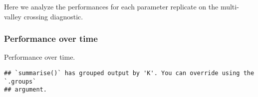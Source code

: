 \documentclass[]{book}
\newenvironment{Shaded}{\begin{snugshade}}{\end{snugshade}}
\newcommand{\DataTypeTok}[1]{\textcolor[rgb]{0.13,0.29,0.53}{#1}}
\newcommand{\KeywordTok}[1]{\textcolor[rgb]{0.13,0.29,0.53}{\textbf{#1}}}
\newcommand{\NormalTok}[1]{#1}
\newcommand{\OperatorTok}[1]{\textcolor[rgb]{0.81,0.36,0.00}{\textbf{#1}}}
\newcommand{\StringTok}[1]{\textcolor[rgb]{0.31,0.60,0.02}{#1}}
\begin{document}
Here we analyze the performances for each parameter replicate on the multi-valley crossing diagnostic.

\hypertarget{performance-over-time-25}{%
\subsubsection{Performance over time}\label{performance-over-time-25}}

Performance over time.

\begin{Shaded}
\end{Shaded}

\begin{verbatim}
## `summarise()` has grouped output by 'K'. You can override using the `.groups`
## argument.
\end{verbatim}
\end{document}
